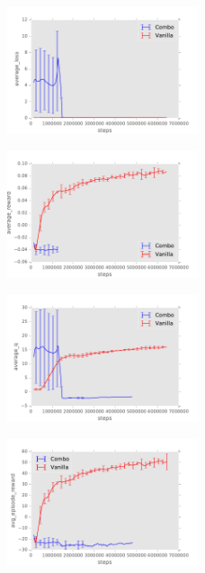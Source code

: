 \documentclass{sig-alternate}
\begin{document}
\begin{figure}
    \centering
    \includegraphics[width=0.5\textwidth]{../results/Boxing/Comparisons/Combo/Combo-baseline-average_loss.pdf}
\end{figure}


\begin{figure}
    \centering
    \includegraphics[width=0.5\textwidth]{../results/Boxing/Comparisons/Combo/Combo-baseline-average_reward.pdf}
\end{figure}

\begin{figure}
    \centering
    \includegraphics[width=0.5\textwidth]{../results/Boxing/Comparisons/Combo/Combo-baseline-average_q.pdf}
\end{figure}

\begin{figure}
    \centering
    \includegraphics[width=0.5\textwidth]{../results/Boxing/Comparisons/Combo/Combo-baseline-avg_episode_reward.pdf}
\end{figure}
\end{document}
